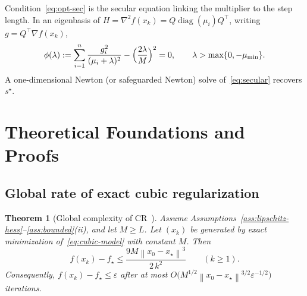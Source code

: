\documentclass[11pt,a4paper]{article}
\newtheorem{theorem}{Theorem}[section]
\newcommand{\norm}[1]{\left\|#1\right\|}
\newcommand{\grad}{\nabla}
\newcommand{\hess}{\nabla^{2}}
\begin{document}
Condition~\eqref{eq:opt-sec} is the secular equation linking the multiplier to the step length.
In an eigenbasis of $H=\hess f(x_{k})=Q\operatorname{diag}(\mu_{i})Q^{\top}$, writing $g=Q^{\top}\grad f(x_{k})$,
\begin{equation}
\label{eq:secular}
\phi(\lambda)
:=
\sum_{i=1}^{n}\frac{g_{i}^{2}}{(\mu_{i}+\lambda)^{2}}
-
\Bigl(\frac{2\lambda}{M}\Bigr)^{2}
=
0,
\qquad
\lambda>\max\{0,-\mu_{\min}\}.
\end{equation}
A one-dimensional Newton (or safeguarded Newton) solve of~\eqref{eq:secular} recovers $s^{\star}$.

\section{Theoretical Foundations and Proofs}
\label{sec:theory}

\subsection{Global rate of exact cubic regularization}

\begin{theorem}[Global complexity of CR~\cite{nesterov2006cubic}]
\label{thm:cr-rate}
Assume Assum\-ptions~\ref{ass:lipschitz-hess}--\ref{ass:bounded}(ii), and let $M\ge L$.
Let $(x_{k})$ be generated by exact minimization of~\eqref{eq:cubic-model} with constant $M$.
Then
\begin{equation}
\label{eq:cr-rate}
f(x_{k})-f_{\star}
\le
\frac{9M\norm{x_{0}-x_{\star}}^{3}}{2\,k^{2}}
\qquad(k\ge 1).
\end{equation}
Consequently, $f(x_{k})-f_{\star}\le\varepsilon$ after at most
$O\bigl(M^{1/2}\norm{x_{0}-x_{\star}}^{3/2}\varepsilon^{-1/2}\bigr)$ iterations.
\end{theorem}
\end{document}
